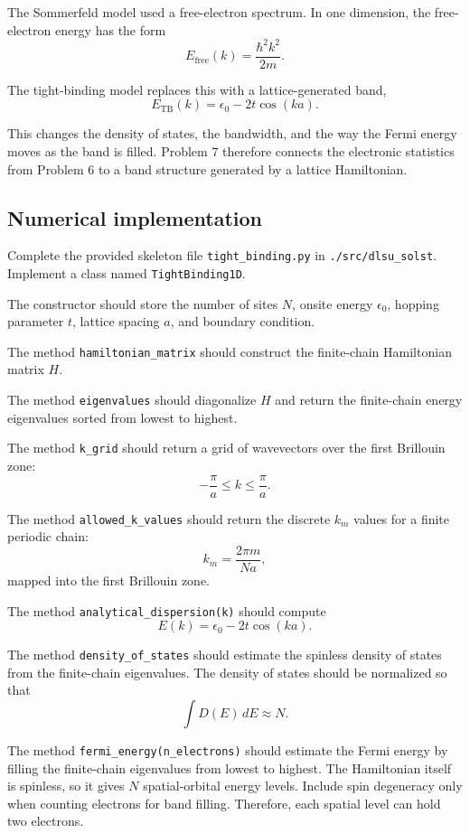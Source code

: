The Sommerfeld model used a free-electron spectrum. In one dimension, the free-electron energy has the form
\[
E_{\mathrm{free}}(k)=\frac{\hbar^2k^2}{2m}.
\]

The tight-binding model replaces this with a lattice-generated band,
\[
E_{\mathrm{TB}}(k)=\epsilon_0-2t\cos(ka).
\]

This changes the density of states, the bandwidth, and the way the Fermi energy moves as the band is filled. Problem 7 therefore connects the electronic statistics from Problem 6 to a band structure generated by a lattice Hamiltonian.

\subsection{Numerical implementation}

Complete the provided skeleton file \texttt{tight\_binding.py} in \texttt{./src/dlsu\_solst}. Implement a class named \texttt{TightBinding1D}.

The constructor should store the number of sites \(N\), onsite energy \(\epsilon_0\), hopping parameter \(t\), lattice spacing \(a\), and boundary condition.

The method \texttt{hamiltonian\_matrix} should construct the finite-chain Hamiltonian matrix \(H\).

The method \texttt{eigenvalues} should diagonalize \(H\) and return the finite-chain energy eigenvalues sorted from lowest to highest.

The method \texttt{k\_grid} should return a grid of wavevectors over the first Brillouin zone:
\[
-\frac{\pi}{a}\le k\le\frac{\pi}{a}.
\]

The method \texttt{allowed\_k\_values} should return the discrete \(k_m\) values for a finite periodic chain:
\[
k_m=\frac{2\pi m}{Na},
\]
mapped into the first Brillouin zone.

The method \texttt{analytical\_dispersion(k)} should compute
\[
E(k)=\epsilon_0-2t\cos(ka).
\]

The method \texttt{density\_of\_states} should estimate the spinless density of states from the finite-chain eigenvalues. The density of states should be normalized so that
\[
\int D(E)\,dE\approx N.
\]

The method \texttt{fermi\_energy(n\_electrons)} should estimate the Fermi energy by filling the finite-chain eigenvalues from lowest to highest. The Hamiltonian itself is spinless, so it gives \(N\) spatial-orbital energy levels. Include spin degeneracy only when counting electrons for band filling. Therefore, each spatial level can hold two electrons.

